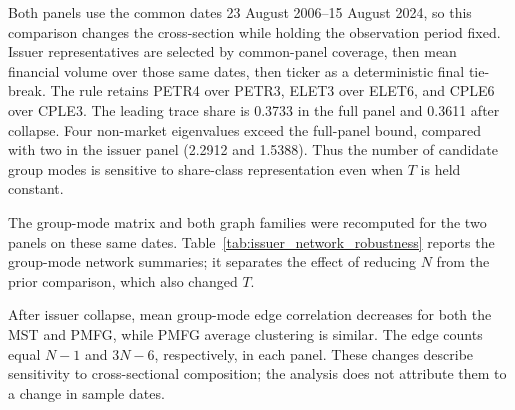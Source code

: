 Both panels use the common dates 23 August 2006--15 August 2024, so this comparison changes the cross-section while holding the observation period fixed. Issuer representatives are selected by common-panel coverage, then mean financial volume over those same dates, then ticker as a deterministic final tie-break. The rule retains PETR4 over PETR3, ELET3 over ELET6, and CPLE6 over CPLE3. The leading trace share is 0.3733 in the full panel and 0.3611 after collapse. Four non-market eigenvalues exceed the full-panel bound, compared with two in the issuer panel (2.2912 and 1.5388). Thus the number of candidate group modes is sensitive to share-class representation even when $T$ is held constant.

The group-mode matrix and both graph families were recomputed for the two panels on these same dates. Table~\ref{tab:issuer_network_robustness} reports the group-mode network summaries; it separates the effect of reducing $N$ from the prior comparison, which also changed $T$.

\begin{center}
\label{tab:issuer_network_robustness}
\small
{}
\end{center}



After issuer collapse, mean group-mode edge correlation decreases for both the MST and PMFG, while PMFG average clustering is similar. The edge counts equal $N-1$ and $3N-6$, respectively, in each panel. These changes describe sensitivity to cross-sectional composition; the analysis does not attribute them to a change in sample dates.

